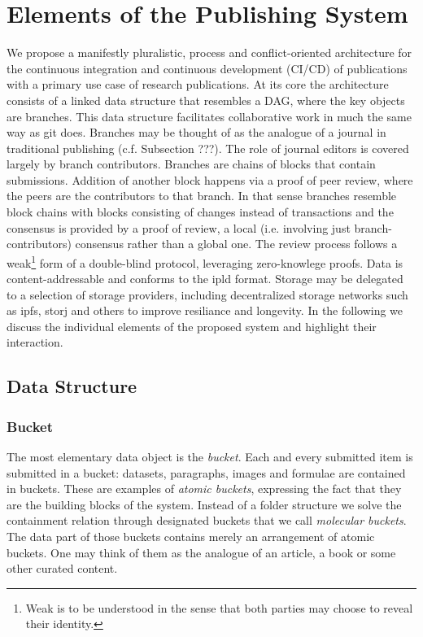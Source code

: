 \documentclass[14pt]{article}
\begin{document}
\section{Elements of the Publishing System}

We propose a manifestly pluralistic, process and conflict-oriented architecture for the continuous integration and continuous development (CI/CD) of publications with a primary use case of research publications. At its core the architecture consists of a linked data structure that resembles a DAG, where the key objects are branches. This data structure facilitates collaborative work in much the same way as git does. Branches may be thought of as the analogue of a journal in traditional publishing (c.f. Subsection ???). The role of journal editors is covered largely by branch contributors. Branches are chains of blocks that contain submissions. Addition of another block happens via a proof of peer review, where the peers are the contributors to that branch. In that sense branches resemble block chains with blocks consisting of changes instead of transactions and the consensus is provided by a  proof of review, a local (i.e. involving just branch-contributors) consensus rather than a global one.
The review process follows a weak\footnote{Weak is to be understood in the sense that both parties may choose to reveal their identity.} form of a double-blind protocol, leveraging zero-knowlege proofs.
Data is content-addressable and conforms to the ipld format. Storage may be delegated to a selection of storage providers, including decentralized storage networks such as ipfs, storj and others to improve resiliance and longevity. In the following we discuss the individual elements of the proposed system and highlight their interaction.

\subsection{Data Structure}
\subsubsection{Bucket}
\label{ssc:bucket}
The most elementary data object is the \textit{bucket}. Each and every submitted item is submitted in a bucket: datasets, paragraphs, images and formulae are contained in buckets. These are examples of \textit{atomic buckets}, expressing the fact that they are the building blocks of the system. 
Instead of a folder structure we solve the containment relation through designated buckets that we call \textit{molecular buckets}. The data part of those buckets contains merely an arrangement of atomic buckets. One may think of them as the analogue of an article, a book or some other curated content. 
\end{document}
